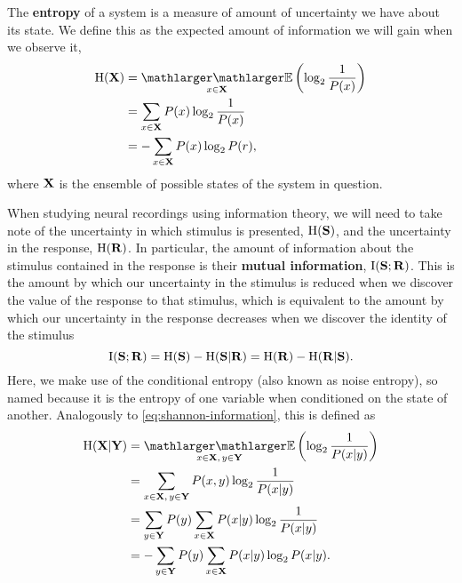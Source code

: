 The \textbf{entropy} of a system is a measure of amount of uncertainty we have about its state.
We define this as the expected amount of information we will gain when we observe it,
\begin{align}
\HH( \SET{X} )
  &= \EE_{x \in \SET{X}} \left( \log_2 \frac{1}{P(x)} \right) \notag
\\&= \sum_{x \in \SET{X}} P(x) \log_2 \frac{1}{P(x)}
\\&= - \sum_{x \in \SET{X}} P(x) \log_2 P(r) \notag
,\end{align}
where $\mathbf{X}$ is the ensemble of possible states of the system in question.

When studying neural recordings using information theory, we will need to take note of the uncertainty in which stimulus is presented, $\operatorname{H}(\mathbf{S})$, and the uncertainty in the response, $\operatorname{H}(\mathbf{R})$.
In particular, the amount of information about the stimulus contained in the response is their \textbf{mutual information}, $\operatorname{I}(\mathbf{S};\mathbf{R})$.
This is the amount by which our uncertainty in the stimulus is reduced when we discover the value of the response to that stimulus, which is equivalent to the amount by which our uncertainty in the response decreases when we discover the identity of the stimulus
\begin{equation}
\operatorname{I}(\mathbf{S};\mathbf{R}) = \operatorname{H}(\mathbf{S}) - \operatorname{H}(\mathbf{S} | \mathbf{R}) = \operatorname{H}(\mathbf{R}) - \operatorname{H}(\mathbf{R} | \mathbf{S})
.\end{equation}
Here, we make use of the conditional entropy (also known as noise entropy), so named because it is the entropy of one variable when conditioned on the state of another.
Analogously to \autoref{eq:shannon-information}, this is defined as
\begin{align}
\HH(\SET{X} | \SET{Y})
  &= \EE_{x \in \SET{X}, \, y \in \SET{Y}} \left( \log_2 \frac{1}{P(x|y)} \right) \notag
\\&= \sum_{x \in \SET{X}, \, y \in \SET{Y}} P(x,y) \log_2 \frac{1}{P(x|y)}
\\&= \sum_{y \in \SET{Y}} P(y) \sum_{x \in \SET{X}} P(x|y) \log_2 \frac{1}{P(x|y)} \notag
\\&= - \sum_{y \in \SET{Y}} P(y) \sum_{x \in \SET{X}} P(x|y) \log_2 P(x|y) \notag
.\end{align}

